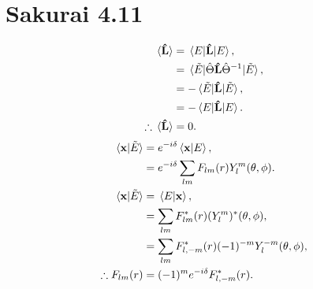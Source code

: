 \documentclass[
a4paper,
10pt,
twoside,
]{article}
\begin{document}
\section{Sakurai 4.11}
\begin{align}
	\ev*{\vu{L}} &= \ev*{\vu{L}}{E},\\
	&= \ev*{\hat{\Theta}\vu{L}\hat{\Theta}^{-1}}{\tilde{E}},\\
	&= -\ev*{\vu{L}}{\tilde{E}},\\
	&= -\ev*{\vu{L}}{E}.\\
	\therefore \ev*{\vu{L}} &= 0.
\end{align}
\begin{align}
	\ip*{\vb{x}}{\tilde{E}} &= e^{-i\delta}\ip*{\vb{x}}{E},\\
	&= e^{-i\delta} \sum_{lm} F_{lm}(r)Y_l^m(\theta,\phi).\\
	\ip*{\vb{x}}{\tilde{E}} &= \ip*{E}{\vb{x}},\\
	&= \sum_{lm} F_{lm}^*(r)(Y_l^m)^*(\theta,\phi),\\
	&= \sum_{lm} F_{l,-m}^*(r)(-1)^{-m}Y_l^{-m}(\theta,\phi),\\
	\therefore F_{lm}(r) &= (-1)^m e^{-i\delta} F_{l,-m}^*(r).
\end{align}
\stopmcols
\end{document}
